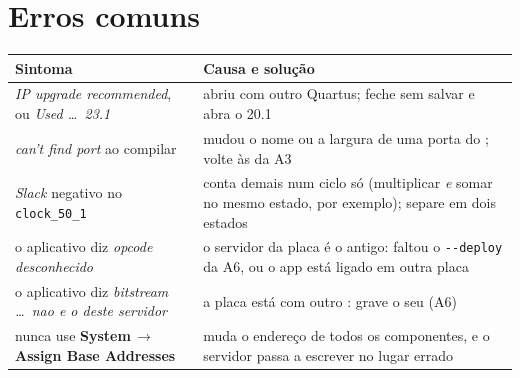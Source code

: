 \documentclass[11pt,a4paper,oneside]{article}
\newcommand{\arq}[1]{{\upshape\ttfamily\detokenize{#1}}}
\newcommand{\menu}[1]{\textsf{\textbf{#1}}}
\newcommand{\seta}{\,\(\rightarrow\)\,}
\begin{document}
\section*{Erros comuns}

\begin{center}\small
\begin{tabularx}{\linewidth}{@{}>{\raggedright}p{5.6cm}X@{}}
\toprule
\textbf{Sintoma} & \textbf{Causa e solução} \\
\midrule
\emph{IP upgrade recommended}, ou \emph{Used \ldots\ 23.1} & abriu com outro Quartus; feche sem salvar e abra o 20.1 \\ \addlinespace
\emph{can't find port} ao compilar & mudou o nome ou a largura de uma porta do \arq{conv_aluno.v}; volte às da A3 \\ \addlinespace
\emph{Slack} negativo no \texttt{clock\_50\_1} & conta demais num ciclo só (multiplicar \emph{e} somar no mesmo estado, por exemplo); separe em dois estados \\ \addlinespace
o aplicativo diz \emph{opcode desconhecido} & o servidor da placa é o antigo: faltou o \texttt{-{}-deploy} da A6, ou o app está ligado em outra placa \\ \addlinespace
o aplicativo diz \emph{bitstream \ldots\ nao e o deste servidor} & a placa está com outro \arq{.sof}: grave o seu (A6) \\ \addlinespace
nunca use \menu{System}\seta\menu{Assign Base Addresses} & muda o endereço de todos os componentes, e o servidor passa a escrever no lugar errado \\
\bottomrule
\end{tabularx}
\end{center}
\end{document}
